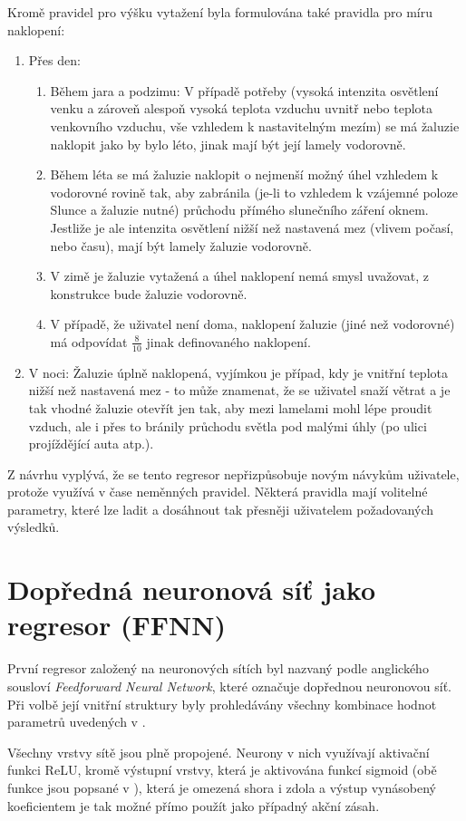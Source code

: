         Kromě pravidel pro výšku vytažení byla formulována také pravidla pro míru naklopení:
        \begin{enumerate}
            \item Přes den:
            \begin{enumerate}
                \item Během jara a podzimu: V případě potřeby (vysoká intenzita osvětlení venku a zároveň alespoň vysoká teplota vzduchu uvnitř nebo teplota venkovního vzduchu, vše vzhledem k nastavitelným mezím) se má žaluzie naklopit jako by bylo léto, jinak mají být její lamely vodorovně.
                \item Během léta se má žaluzie naklopit o nejmenší možný úhel vzhledem k vodorovné rovině tak, aby zabránila (je-li to vzhledem k vzájemné poloze Slunce a žaluzie nutné) průchodu přímého slunečního záření oknem. Jestliže je ale intenzita osvětlení nižší než nastavená mez (vlivem počasí, nebo času), mají být lamely žaluzie vodorovně.
                \item V zimě je žaluzie vytažená a úhel naklopení nemá smysl uvažovat, z konstrukce bude žaluzie vodorovně.
                \item V případě, že uživatel není doma, naklopení žaluzie (jiné než vodorovné) má odpovídat $\frac{8}{10}$ jinak definovaného naklopení.
            \end{enumerate}
            \item V noci: Žaluzie úplně naklopená, vyjímkou je případ, kdy je vnitřní teplota nižší než nastavená mez - to může znamenat, že se uživatel snaží větrat a je tak vhodné žaluzie otevřít jen tak, aby mezi lamelami mohl lépe proudit vzduch, ale i přes to bránily průchodu světla pod malými úhly (po ulici projíždějící auta atp.).
        \end{enumerate}

        Z návrhu vyplývá, že se tento regresor nepřizpůsobuje novým návykům uživatele, protože využívá v čase neměnných pravidel. Některá pravidla mají volitelné parametry, které lze ladit a dosáhnout tak přesněji uživatelem požadovaných výsledků. 
    \section{Dopředná neuronová síť jako regresor (FFNN)} \label{sec:ffnn}
        První regresor založený na neuronových sítích byl nazvaný  podle anglického sousloví \emph{Feedforward Neural Network}, které označuje dopřednou neuronovou síť. Při volbě její vnitřní struktury byly prohledávány všechny kombinace hodnot parametrů uvedených v .
        
        Všechny vrstvy sítě jsou plně propojené. Neurony v nich využívají aktivační funkci ReLU, kromě výstupní vrstvy, která je aktivována funkcí sigmoid (obě funkce jsou popsané v ), která je omezená shora i zdola a výstup vynásobený koeficientem je tak možné přímo použít jako případný akční zásah.
